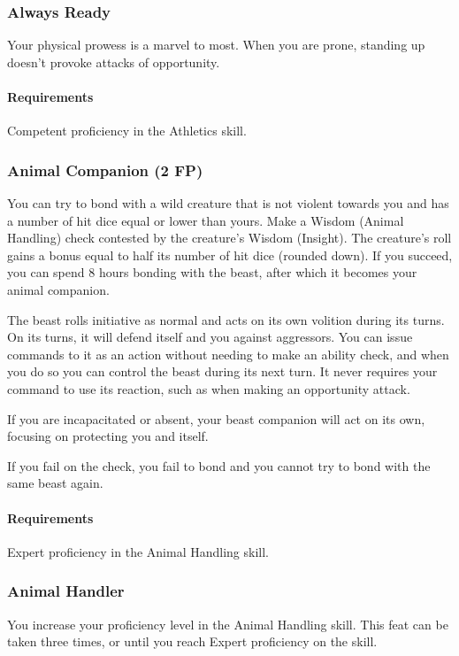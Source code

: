 \subsubsection{Always Ready} \label{feat::alwaysready}
    Your physical prowess is a marvel to most.
    When you are prone, standing up doesn't provoke attacks of opportunity.
    \paragraph{Requirements} Competent proficiency in the Athletics skill.
\subsubsection{Animal Companion (2 FP)} \label{feat::animalcompanion}
    You can try to bond with a wild creature that is not violent towards you and has a number of hit dice equal or lower than yours.
    Make a Wisdom (Animal Handling) check contested by the creature's Wisdom (Insight).
    The creature's roll gains a bonus equal to half its number of hit dice (rounded down).
    If you succeed, you can spend 8 hours bonding with the beast, after which it becomes your animal companion.

    The beast rolls initiative as normal and acts on its own volition during its turns.
    On its turns, it will defend itself and you against aggressors.
    You can issue commands to it as an action without needing to make an ability check, and when you do so you can control the beast during its next turn.
    It never requires your command to use its reaction, such as when making an opportunity attack.

    If you are incapacitated or absent, your beast companion will act on its own, focusing on protecting you and itself.

    If you fail on the check, you fail to bond and you cannot try to bond with the same beast again.
    \paragraph{Requirements} Expert proficiency in the Animal Handling skill.
\subsubsection{Animal Handler} \label{feat::animalhandler}
    You increase your proficiency level in the Animal Handling skill.
    This feat can be taken three times, or until you reach Expert proficiency on the skill.
